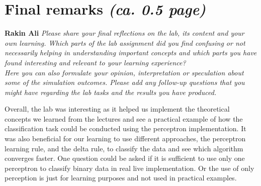 \documentclass[a4paper]{article}
\begin{document}
\section{Final remarks \normalsize{\textit{(ca. 0.5 page)}}} \textbf{Rakin Ali }
\textit{Please share your final reflections on the lab, its content and your own learning. Which parts of the lab assignment did you find confusing or not necessarily helping in understanding important concepts and which parts you have found interesting and relevant to your learning experience? \\
Here you can also formulate your opinion, interpretation or speculation about some of the simulation outcomes. Please add any follow-up questions that you might have regarding the lab tasks and the results you have produced.}

Overall, the lab was interesting as it helped us implement the theoretical concepts we learned from the lectures and see a practical example of how the classification task could be conducted using the perceptron implementation. It was also beneficial for our learning to use different approaches, the perceptron learning rule, and the delta rule, to classify the data and see which algorithm converges faster. One question could be asked if it is sufficient to use only one perceptron to classify binary data in real live implementation. Or the use of only perception is just for learning purposes and not used in practical examples. 
\end{document}
